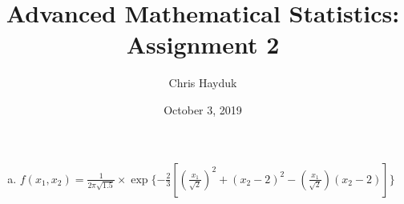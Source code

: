 \documentclass[12pt]{article}\usepackage[]{graphicx}\usepackage[]{color}
\newenvironment{problem}[2][Problem]{\begin{trivlist}
\item[\hskip \labelsep {\bfseries #1}\hskip \labelsep {\bfseries #2.}]}{\end{trivlist}}
\begin{document}
\title{Advanced Mathematical Statistics: Assignment 2}

\author{Chris Hayduk}
\date{October 3, 2019}

\maketitle




\begin{problem}{4.2}
\end{problem}

\begin{enumerate}[a)]

\item $f(x_1, x_2) = \frac{1}{2\pi\sqrt{1.5}} \times \exp\{-\frac{2}{3}[\left(\frac{x_1}{\sqrt{2}}\right)^2 + \left(x_2 - 2\right)^2 - \left(\frac{x_1}{\sqrt{2}}\right)\left(x_2 - 2\right)]\}$


\end{enumerate}
\end{document}
